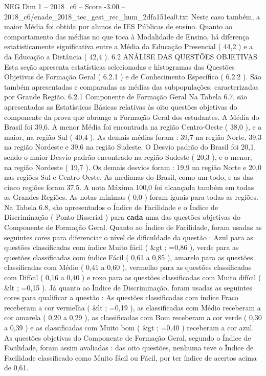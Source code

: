 \begin{textsample}{NEG Dim 1 – 2018\_c6 – Score -3.00 – 2018\_c6/enade\_2018\_tec\_gest\_rec\_hum\_2dfa151ea0.txt}
Neste caso também, a maior Média foi obtida por alunos de IES Públicas de ensino.
Quanto ao comportamento das médias no que toca à Modalidade de Ensino, há diferença estatisticamente significativa entre a Média da Educação Presencial ( 44,2 ) e a da Educação a Distância ( 42,4 ). 6.2 ANÁLISE DAS QUESTÕES OBJETIVAS Esta seção apresenta estatísticas selecionadas e histogramas das Questões Objetivas de Formação Geral ( 6.2.1 ) e de Conhecimento Específico ( 6.2.2 ).
São também apresentadas e comparadas as médias das subpopulações, caracterizadas por Grande Região. 6.2.1 Componente de Formação Geral Na Tabela 6.7, são apresentadas as Estatísticas Básicas relativas às oito questões objetivas do componente da prova que abrange a Formação Geral dos estudantes.
A Média do Brasil foi 39,6.
A menor Média foi encontrada na região Centro-Oeste ( 38,0 ), e a maior, na região Sul ( 40,4 ).
As demais médias foram : 39,7 na região Norte, 39,3 na região Nordeste e 39,6 na região Sudeste.
O Desvio padrão do Brasil foi 20,1, sendo o maior Desvio padrão encontrado na região Sudeste ( 20,3 ), e o menor, na região Nordeste ( 19,7 ).
Os demais desvios foram : 19,9 na região Norte e 20,0 nas regiões Sul e Centro-Oeste.
As medianas do Brasil, como um todo, e as das cinco regiões foram 37,5.
A nota Máxima 100,0 foi alcançada também em todas as Grandes Regiões.
As notas mínimas ( 0,0 ) foram iguais para todas as regiões.
Na Tabela 6.8, são apresentados o Índice de Facilidade e o Índice de Discriminação ( Ponto-Bisserial ) para \textbf{cada} uma das questões objetivas do Componente de Formação Geral.
Quanto ao Índice de Facilidade, foram usadas as seguintes cores para diferenciar o nível de dificuldade da questão : Azul para as questões classificadas com índice Muito fácil ( \&gt ; =0,86 ), verde para as questões classificadas com índice Fácil ( 0,61 a 0,85 ), amarelo para as questões classificadas com Médio ( 0,41 a 0,60 ), vermelho para as questões classificadas com Difícil ( 0,16 a 0,40 ) e roxo para as questões classificadas com Muito difícil ( \&lt ; =0,15 ).
Já quanto ao Índice de Discriminação, foram usadas as seguintes cores para qualificar a questão : As questões classificadas com índice Fraco receberam a cor vermelha ( \&lt ; =0,19 ), as classificadas com Médio receberam a cor amarela ( 0,20 a 0,29 ), as classificadas com Bom receberam a cor verde ( 0,30 a 0,39 ) e as classificadas com Muito bom ( \&gt ; =0,40 ) receberam a cor azul.
As questões objetivas do Componente de Formação Geral, segundo o Índice de Facilidade, foram assim avaliadas : das oito questões, nenhuma teve o Índice de Facilidade classificado como Muito fácil ou Fácil, por ter índice de acertos acima de 0,61.

\end{textsample}
